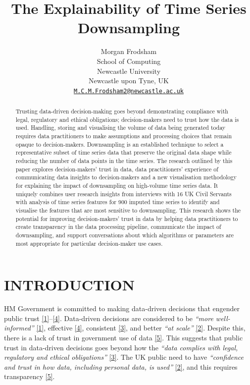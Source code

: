 \documentclass{article}
\title{The Explainability of Time Series Downsampling}
\author{
    Morgan Frodsham
   \\
    School of Computing \\
    Newcastle University \\
  Newcastle upon Tyne, UK \\
  \texttt{\href{mailto:M.C.M.Frodsham2@newcastle.ac.uk}{\nolinkurl{M.C.M.Frodsham2@newcastle.ac.uk}}} \\
  }
\begin{document}
\maketitle


\begin{abstract}
Trusting data-driven decision-making goes beyond demonstrating
compliance with legal, regulatory and ethical obligations;
decision-makers need to trust how the data is used. Handling, storing
and visualising the volume of data being generated today requires data
practitioners to make assumptions and processing choices that remain
opaque to decision-makers. Downsampling is an established technique to
select a representative subset of time series data that preserve the
original data shape while reducing the number of data points in the time
series. The research outlined by this paper explores decision-makers'
trust in data, data practitioners' experience of communicating data
insights to decision-makers and a new visualisation methodology for
explaining the impact of downsampling on high-volume time series data.
It uniquely combines user research insights from interviews with 16 UK
Civil Servants with analysis of time series features for 900 imputed
time series to identify and visualise the features that are most
sensitive to downsampling. This research shows the potential for
improving decision-makers' trust in data by helping data practitioners
to create transparency in the data processing pipeline, communicate the
impact of downsampling, and support conversations about which algorithms
or parameters are most appropriate for particular decision-maker use
cases.
\end{abstract}


\hypertarget{introduction}{%
\section{INTRODUCTION}\label{introduction}}

HM Government is committed to making data-driven decisions that engender
public trust
\protect\hyperlink{ref-data2017}{{[}1{]}}--\protect\hyperlink{ref-data2022}{{[}4{]}}.
Data-driven decisions are considered to be \emph{``more well-informed''}
\protect\hyperlink{ref-data2017}{{[}1{]}}, effective
\protect\hyperlink{ref-data2022}{{[}4{]}}, consistent
\protect\hyperlink{ref-data2021}{{[}3{]}}, and better \emph{``at
scale''} \protect\hyperlink{ref-data2020}{{[}2{]}}. Despite this, there
is a lack of trust in government use of data
\protect\hyperlink{ref-trust}{{[}5{]}}. This suggests that public trust
in data-driven decisions goes beyond how the \emph{``data complies with
legal, regulatory and ethical obligations''}
\protect\hyperlink{ref-data2021}{{[}3{]}}. The UK public need to have
\emph{``confidence and trust in how data, including personal data, is
used''} \protect\hyperlink{ref-data2020}{{[}2{]}}, and this requires
transparency \protect\hyperlink{ref-trust}{{[}5{]}}.
\end{document}
